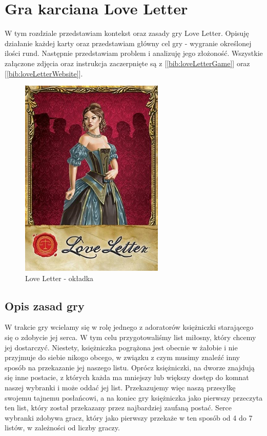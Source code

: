 \chapter{Gra karciana Love Letter}
\label{cha:rozdz2}

W tym rozdziale przedstawiam kontekst oraz zasady gry Love Letter. Opisuję działanie każdej karty oraz przedstawiam główny cel gry - wygranie określonej ilości rund. Następnie przedstawiam problem i analizuję jego złożoność. Wszystkie załączone zdjęcia oraz instrukcja zaczerpnięte są z [\ref{bib:loveLetterGame}] oraz [\ref{bib:loveLetterWebsite}].

\begin{figure}[h]
	\centering
	\includegraphics{Resources/ll_main_image.png}
	\caption{Love Letter - okładka} 
	\label{fig:llMainImage}
\end{figure}

\section{Opis zasad gry}
\label{sec:opisGry}
W trakcie gry wcielamy się w rolę jednego z adoratorów księżniczki starającego się o zdobycie jej serca. W tym celu przygotowaliśmy list miłosny, który chcemy jej dostarczyć. Niestety, księżniczka pogrążona jest obecnie w żałobie i nie przyjmuje do siebie nikogo obcego, w związku z czym musimy znaleźć inny sposób na przekazanie jej naszego listu. Oprócz księżniczki, na dworze znajdują się inne postacie, z których każda ma mniejszy lub większy dostęp do komnat naszej wybranki i może oddać jej list. Przekazujemy więc naszą przesyłkę swojemu tajnemu posłańcowi, a na koniec gry księżniczka jako pierwszy przeczyta ten list, który został przekazany przez najbardziej zaufaną postać. Serce wybranki zdobywa gracz, który jako pierwszy przekaże w ten sposób od 4 do 7 listów, w zależności od liczby graczy.

